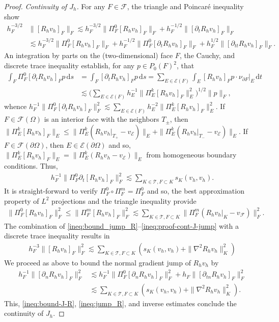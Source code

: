 \documentclass[a4paper]{amsart}
\numberwithin{equation}{section}
\def\F{\mathcal{F}}
\def\E{\mathcal{E}}
\def\T{\mathcal{T}}
\newcommand\ds{\,\text{d}s}
\newcommand\dt{\,\text{d}t}
\theoremstyle{definition}
\theoremstyle{remark}
\numberwithin{theorem}{section}
\numberwithin{equation}{section}
\numberwithin{table}{section}
\numberwithin{figure}{section}
\begin{document}
\begin{proof}
\noindent\emph{Continuity of $J_h$.}
For any $F \in \F$, the triangle and Poincar\'e inequality show
\begin{align}\label{ineq:bound_jump_R}
    h_F^{-3/2}&\|[R_h v_h]_F\|_F \lesssim h_F^{-3/2}\|\Pi_F^0[R_h v_h]_F\|_F + h_F^{-1/2}\|[\partial_t R_h v_h]_F\|_F\nonumber\\
    &\lesssim h_F^{-3/2}\|\Pi_F^0[R_h v_h]_F\|_F + h_F^{-1/2}\|\Pi_F^0 [\partial_t R_h v_h]_F\|_F + h_F^{1/2}\|[\partial_{tt} R_h v_h]_F\|_F.
\end{align}
An integration by parts on the (two-dimensional) face $F$, the Cauchy, and discrete trace inequality establish, for any $p \in P_0(F)^2$, that
\begin{align*}
    \int_F \Pi_F^0 [\partial_t R_h v_h]_F p \ds &= \int_F [\partial_t R_h v_h]_F p \ds = \sum_{E \in \E(F)} \int_E [R_h v_h]_F p \cdot \nu_{\partial F}|_E \dt\\
    &\lesssim \Big(\sum_{E \in \E(F)} h_E^{-1}\|\Pi_E^k[R_h v_h]_F\|_E^2\Big)^{1/2}\|p\|_F,
\end{align*}
whence $h_F^{-1}\|\Pi_F^0 [\partial_t R_h v_h]_F\|_F^2 \lesssim \sum_{E \in \E(F)} h_E^{-2}\|\Pi_E^k [R_h v_h]_F\|_E^2$. If $F \in \F(\Omega)$ is an interior face with the neighbors $T_\pm$, then $\|\Pi_E^k [R_h v_h]_F\|_E \leq \|\Pi_E^k(R_h v_h|_{T_+} - v_\E)\|_E + \|\Pi_E^k(R_h v_h|_{T_-} - v_\E)\|_E$. If $F \in \F(\partial \Omega)$, then $E \in \E(\partial \Omega)$ and so, $\|\Pi_E^k[R_h v_h]_F\|_E = \|\Pi_E^k(R_h v_h - v_\E)\|_E$ from homogeneous boundary conditions. Thus,
\begin{align}\label{ineq:proof-cont-J-dt}
    h_F^{-1}\|\Pi_F^0 \partial_t [R_h v_h]_F\|_F^2 \lesssim \sum_{K \in \T, F \subset K} s_K(v_h,v_h).
\end{align}
It is straight-forward to verify $\Pi_F^0 \circ \Pi_F^m = \Pi_F^0$ and so, the best approximation property of $L^2$ projections
and the triangle inequality provide
\begin{align}\label{ineq:proof-cont-J-jump}
    \|\Pi_F^0[R_h v_h]_F\|_F^2 \leq \|\Pi_F^m[R_h v_h]_F\|_F^2 \lesssim \sum_{K \in \T, F \subset K} \|\Pi_F^m(R_h v_h|_K - v_\F)\|_F^2.
\end{align}
The combination of \eqref{ineq:bound_jump_R}--\eqref{ineq:proof-cont-J-jump} with a discrete trace inequality results in
\begin{align}\label{ineq:jump_R}
    h_F^{-3}\|[R_h v_h]_F\|_F^2 \lesssim \sum_{K \in \T, F \subset K} (s_K(v_h,v_h) + \|\nabla^2 R_h v_h\|_K^2)
\end{align}
We proceed as above to bound the normal gradient jump of $R_h v_h$ by
\begin{align}\label{ineq:normal_jump_R}
    h_F^{-1} \|[\partial_n R_h v_h]_F\|_F^2 &\lesssim h_F^{-1} \|\Pi_F^0[\partial_n R_h v_h]_F\|_F^2 + h_{F}\|[\partial_{tn} R_h v_h]_F\|_F^2\nonumber\\
    &\lesssim
    \sum_{K \in \T, F \subset K} (s_K(v_h,v_h) + \|\nabla^2 R_h v_h\|_K^2).
\end{align}
This, \eqref{ineq:bound-J-R}, \eqref{ineq:jump_R}, and inverse estimates conclude the continuity of $J_h$.
\end{proof}
\end{document}
